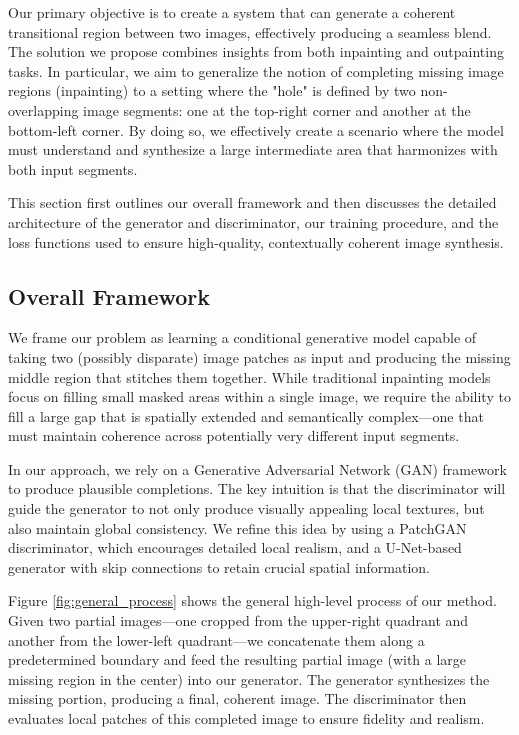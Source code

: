 \documentclass[sigconf]{acmart}
\begin{document}
Our primary objective is to create a system that can generate a coherent transitional region between two images, effectively producing a seamless blend. The solution we propose combines insights from both inpainting and outpainting tasks. In particular, we aim to generalize the notion of completing missing image regions (inpainting) to a setting where the "hole" is defined by two non-overlapping image segments: one at the top-right corner and another at the bottom-left corner. By doing so, we effectively create a scenario where the model must understand and synthesize a large intermediate area that harmonizes with both input segments.

This section first outlines our overall framework and then discusses the detailed architecture of the generator and discriminator, our training procedure, and the loss functions used to ensure high-quality, contextually coherent image synthesis.

\subsection*{Overall Framework}

We frame our problem as learning a conditional generative model capable of taking two (possibly disparate) image patches as input and producing the missing middle region that stitches them together. While traditional inpainting models focus on filling small masked areas within a single image, we require the ability to fill a large gap that is spatially extended and semantically complex—one that must maintain coherence across potentially very different input segments.

In our approach, we rely on a Generative Adversarial Network (GAN) framework to produce plausible completions. The key intuition is that the discriminator will guide the generator to not only produce visually appealing local textures, but also maintain global consistency. We refine this idea by using a PatchGAN discriminator, which encourages detailed local realism, and a U-Net-based generator with skip connections to retain crucial spatial information.

Figure \ref{fig:general_process} shows the general high-level process of our method. Given two partial images—one cropped from the upper-right quadrant and another from the lower-left quadrant—we concatenate them along a predetermined boundary and feed the resulting partial image (with a large missing region in the center) into our generator. The generator synthesizes the missing portion, producing a final, coherent image. The discriminator then evaluates local patches of this completed image to ensure fidelity and realism.
\end{document}

